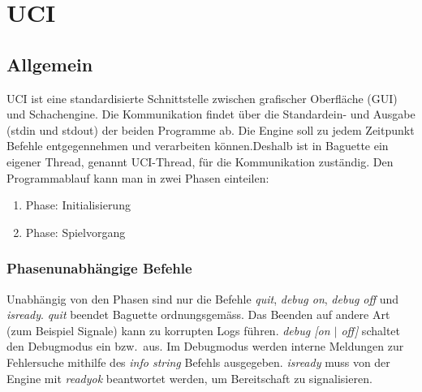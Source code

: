 \section{UCI}\label{sec:uci}
\subsection{Allgemein}\label{subsec:allgemein}
UCI ist eine standardisierte Schnittstelle zwischen grafischer Oberfl\"ache (GUI) und Schachengine.
Die Kommunikation findet \"uber die Standardein- und Ausgabe (stdin und stdout) der beiden Programme ab.\citeuci[9]
\newline
Die Engine soll zu jedem Zeitpunkt Befehle entgegennehmen und verarbeiten k\"onnen.\citeuci[15]
Deshalb ist in Baguette ein eigener Thread, genannt UCI-Thread, f\"ur die Kommunikation zust\"andig.
\newline
Den Programmablauf kann man in zwei Phasen einteilen:
\begin{enumerate}
    \item Phase: Initialisierung
    \item Phase: Spielvorgang
\end{enumerate}
\subsubsection{Phasenunabh\"angige Befehle}
Unabh\"angig von den Phasen sind nur die Befehle \textit{quit}, \textit{debug on}, \textit{debug off} und \textit{isready}.
\newline\textit{quit} beendet Baguette ordnungsgem\"ass.
Das Beenden auf andere Art (zum Beispiel Signale) kann zu korrupten Logs f\"uhren.
\newline \textit{debug [on $|$ off]} schaltet den Debugmodus ein bzw.\  aus.
Im Debugmodus werden interne Meldungen zur Fehlersuche mithilfe des \textit{info string} Befehls ausgegeben.
\newline \textit{isready} muss von der Engine mit \textit{readyok} beantwortet werden, um Bereitschaft zu signalisieren.
